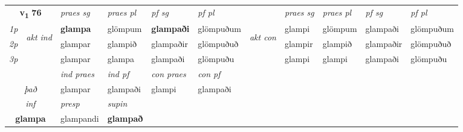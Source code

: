 \noindent
\begin{tabular}{lllllllllll} \toprule
\multicolumn{2}{c}{\textbf{v{\textsubscript{1}}} \Large{\textbf{76}}}  &  \textit{praes sg}  & \textit{praes pl}  &\textit{ pf sg} & \textit{pf pl} &  &  \textit{praes sg}  & \textit{praes pl}  & \textit{pf sg} & \textit{pf pl } \\*
	\cmidrule{3-6} \cmidrule{8-11}
 {\textit{1p}} & \multirow{3}{*}{\begin{turn}{90}\textit{akt ind}\end{turn}} & \textbf{glampa} & glömpum & \textbf{glampaði} & glömpuðum & \multirow{3}{*}{\begin{turn}{90}\textit{akt con}\end{turn}} &glampi & glömpum & glampaði & glömpuðum\\*
 {\textit{2p}} &  &  glampar  & glampið & glampaðir & glömpuðuð & & glampir & glampið & glampaðir & glömpuðuð \\*
{\textit{3p}} &  & glampar & glampa & glampaði & glömpuðu & & glampi & glampi& glampaði & glömpuðu \\*
\cmidrule{3-6} \cmidrule{8-11}

   & &  \textit{ind praes} & \textit{ind pf} & \textit{con praes} & \textit{con pf} \\*
\multicolumn{2}{c}{ \textit{það} } & glampar & glampaði & glampi & glampaði \\*

\cmidrule{3-4}
   \multicolumn{2}{c}{\textit{inf}}     & \textit{presp} & \textit{supin}   \\*
  \multicolumn{2}{c}{\textbf{glampa}}      & glampandi &  \textbf{glampað}   \\*
\end{tabular}

